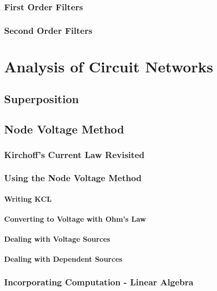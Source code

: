 \documentclass[a4paper,11pt]{book}
\begin{document}
\section{First Order Filters}
\section{Second Order Filters}

\part{Analysis of Circuit Networks}
\chapter{Superposition}

\chapter{Node Voltage Method}
\section{Kirchoff's Current Law Revisited}
\section{Using the Node Voltage Method}
\subsection*{Writing KCL}
\subsection*{Converting to Voltage with Ohm's Law}
\subsection*{Dealing with Voltage Sources}
\subsection*{Dealing with Dependent Sources}
\section{Incorporating Computation - Linear Algebra}
\end{document}
